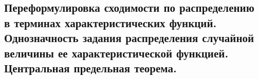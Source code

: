 \subsection{Переформулировка сходимости по распределению в терминах характеристических функций. Однозначность задания распределения случайной величины ее характеристической функцией. Центральная предельная теорема.}